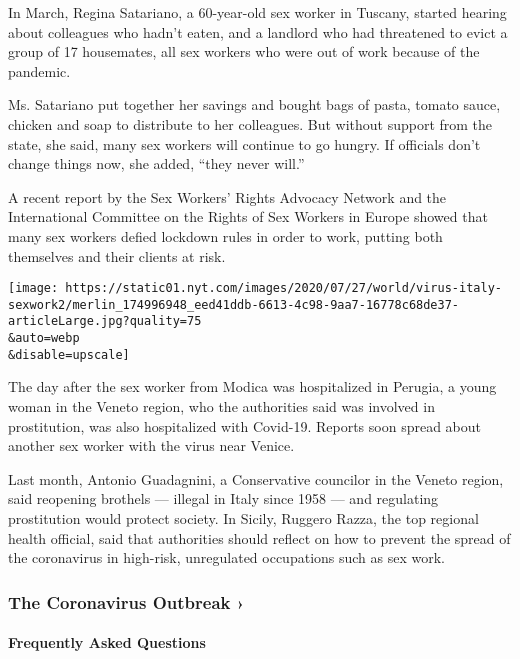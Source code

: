 In March, Regina Satariano, a 60-year-old sex worker in Tuscany, started
hearing about colleagues who hadn't eaten, and a landlord who had
threatened to evict a group of 17 housemates, all sex workers who were
out of work because of the pandemic.

Ms. Satariano put together her savings and bought bags of pasta, tomato
sauce, chicken and soap to distribute to her colleagues. But without
support from the state, she said, many sex workers will continue to go
hungry. If officials don't change things now, she added, ``they never
will.''

A recent report by the Sex Workers' Rights Advocacy Network and the
International Committee on the Rights of Sex Workers in Europe showed
that many sex workers defied lockdown rules in order to work, putting
both themselves and their clients at risk.

\texttt{[image: https://static01.nyt.com/images/2020/07/27/world/virus-italy-sexwork2/merlin\_174996948\_eed41ddb-6613-4c98-9aa7-16778c68de37-articleLarge.jpg?quality=75\\\&auto=webp\\\&disable=upscale]}

The day after the sex worker from Modica was hospitalized in Perugia, a
young woman in the Veneto region, who the authorities said was involved
in prostitution, was also hospitalized with Covid-19. Reports soon
spread about another sex worker with the virus near Venice.

Last month, Antonio Guadagnini, a Conservative councilor in the Veneto
region, said reopening brothels --- illegal in Italy since 1958 --- and
regulating prostitution would protect society. In Sicily, Ruggero Razza,
the top regional health official, said that authorities should reflect
on how to prevent the spread of the coronavirus in high-risk,
unregulated occupations such as sex work.

\href{https://www.nytimes.com/news-event/coronavirus?action=click\&pgtype=Article\&state=default\&region=MAIN_CONTENT_3\&context=storylines_faq}{}

\hypertarget{the-coronavirus-outbreak-}{%
\subsubsection{The Coronavirus Outbreak
›}\label{the-coronavirus-outbreak-}}

\hypertarget{frequently-asked-questions}{%
\paragraph{Frequently Asked
Questions}\label{frequently-asked-questions}}

